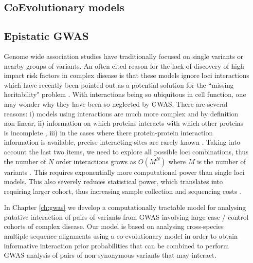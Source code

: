   
\subsection{CoEvolutionary models}


\subsection{Epistatic GWAS \label{sec:epigwas}}

Genome wide association studies have traditionally focused on single variants or nearby groups of variants. An often cited reason for the lack of discovery of high impact risk factors in complex disease is that these models ignore loci interactions \cite{cordell2009detecting} which have recently been pointed out as a potential solution for the ``missing heritability" problem \cite{zuk2012mystery, zuk2014searching}. With interactions being so ubiquitous in cell function, one may wonder why they have been so neglected by GWAS. There are several reasons: i) models using interactions are much more complex \cite{gao2010classification} and by definition non-linear, ii) information on which proteins interacts with which other proteins is incomplete \cite{venkatesan2009empirical}, iii) in the cases where there protein-protein interaction information is available, precise interacting sites are rarely known \cite{venkatesan2009empirical}. Taking into account the last two items, we need to explore all possible loci combinations, thus the number of $N$ order interactions grows as $O(M^N)$ where $M$ is the number of variants \cite{de2013emerging}. This requires exponentially more computational power than single loci models. This also severely reduces statistical power, which translates into requiring larger cohort, thus increasing sample collection and sequencing costs \cite{de2013emerging}.

In Chapter \ref{ch:gwas} we develop a computationally tractable model for analysing putative interaction of pairs of variants from GWAS involving large case / control cohorts of complex disease. Our model is based on analysing cross-species multiple sequence alignments using a co-evolutionary model in order to obtain informative interaction prior probabilities that can be combined to perform GWAS analysis of pairs of non-synonymous variants that may interact.

